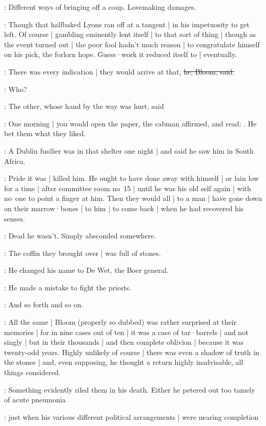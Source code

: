 :
Different ways of bringing off a coup.
Lovemaking damages.

:
Though that halfbaked Lyons ran off at a tangent |
in his impetuosity to get left.
Of course |
gambling eminently lent itself |
to that sort of thing |
though as the event turned out |
the poor fool hadn't much reason |
to congratulate himself on his pick,
the forlorn hope.
Guess·work it reduced itself to |
eventually.

\Bloom:
There was every indication |
they would arrive at that,
\sout{he, Bloom, said.}

\Stephen:
Who?

:
The other,
whose hand by the way was hurt,
said

:
One morning |
you would open the paper,
the cabman affirmed,
and read: .
He bet them what they liked.

:
A Dublin fusilier was in that shelter one night |
and said he saw him in South Africa.

:
Pride it was |
killed him.
He ought to have done away with himself |
or lain low for a time |
after committee room no~15 |
until he was his old self again |
with no~one to point a finger at him.
Then they would all |
to a man |
have gone down on their marrow·bones |
to him |
to come back |
when he had recovered his senses.

:
Dead he wasn't.
Simply absconded somewhere.

:
The coffin they brought over |
was full of stones.

:
He changed his name to De Wet,
the Boer general.

:
He made a mistake to fight the priests.

:
And so forth and so on.

:
All the same |
Bloom
(properly so dubbed)
was rather surprised at their memories |
for in nine cases out of ten |
it was a case of tar·barrels |
and not singly |
but in their thousands |
and then complete oblivion |
because it was twenty-odd years.%
Highly unlikely of course |
there was even a shadow of truth in the stones |
and,
even supposing,
he thought a return highly inadvisable,
all things considered.

:
Something evidently riled them in his death.
Either he petered out too tamely of acute pneumonia

:
just when his various different political arrangements |
were nearing completion

